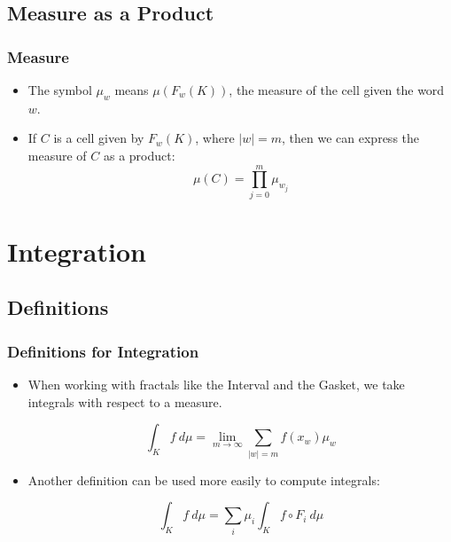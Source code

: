 \documentclass{beamer}
\begin{document}
\subsection{Measure as a Product}
\begin{frame}
	\frametitle{Measure}
	\begin{itemize}
		\item The symbol $\mu_w$ means $\mu(F_w (K))$, the measure of the cell given the word $w$.
		\item If $C$ is a cell given by $F_w (K)$, where $|w| = m$, then we can express the measure of $C$ as a product:
			\[
			\mu(C) = \prod_{j = 0}^m \mu_{w_j}
			\]
	\end{itemize}
\end{frame}

\section{Integration}
\subsection{Definitions}
\begin{frame}
	\frametitle{Definitions for Integration}
	\begin{itemize}
		\item When working with fractals like the Interval and the Gasket, we take integrals with respect to a measure.
			\begin{definition}
				\[
				\int_K f\ d \mu = \lim_{m \to \infty} \sum_{|w| = m} f(x_w) \mu_w
				\]
			\end{definition}
		\item Another definition can be used more easily to compute integrals:
			\begin{definition}
				\[
				\int_K f\ d \mu = \sum_i \mu_i \int_K f \circ F_i\ d \mu
				\]
			\end{definition}
	\end{itemize}	
\end{frame}
\end{document}
